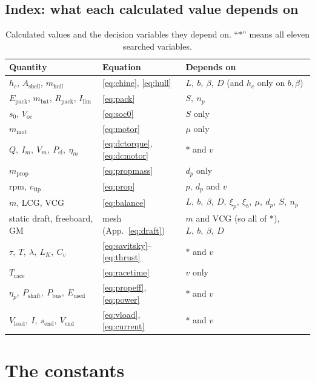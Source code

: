 \documentclass[11pt,a4paper]{article}
\renewcommand{\_}{\textunderscore\allowbreak}
\newcommand{\Trace}{T_{\mathrm{race}}}
\newcommand{\Pshaft}{P_{\mathrm{shaft}}}
\newcommand{\Pbus}{P_{\mathrm{bus}}}
\newcommand{\Eused}{E_{\mathrm{used}}}
\newcommand{\Epack}{E_{\mathrm{pack}}}
\newcommand{\Voc}{V_{\mathrm{oc}}}
\newcommand{\Vload}{V_{\mathrm{load}}}
\newcommand{\Vend}{V_{\mathrm{end}}}
\newcommand{\Rpack}{R_{\mathrm{pack}}}
\newcommand{\lcg}{\mathrm{LCG}}
\newcommand{\vcg}{\mathrm{VCG}}
\begin{document}
\subsection{Index: what each calculated value depends on}
\begin{table}[H]
\centering\small
\caption{Calculated values and the decision variables they depend on. ``$\ast$'' means all eleven searched variables.}
\label{tab:index}
\begin{tabularx}{\textwidth}{@{}l l X@{}}
\toprule
Quantity & Equation & Depends on \\
\midrule
$h_c$, $A_{\mathrm{shell}}$, $m_{\mathrm{hull}}$ & \eqref{eq:chine}, \eqref{eq:hull} & $L,\ b,\ \beta,\ D$ (and $h_c$ only on $b,\beta$) \\
$\Epack$, $m_{\mathrm{bat}}$, $\Rpack$, $I_{\lim}$ & \eqref{eq:pack} & $S,\ n_p$ \\
$s_0$, $\Voc$ & \eqref{eq:soc0} & $S$ only \\
$m_{\mathrm{mot}}$ & \eqref{eq:motor} & $\mu$ only \\
$Q,\ I_m,\ V_m,\ P_{\mathrm{el}},\ \eta_m$ & \eqref{eq:dctorque}, \eqref{eq:dcmotor} & $\ast$ and $v$ \\
$m_{\mathrm{prop}}$ & \eqref{eq:propmass} & $d_p$ only \\
rpm, $v_{\mathrm{tip}}$ & \eqref{eq:prop} & $p,\ d_p$ and $v$ \\
$m$, $\lcg$, $\vcg$ & \eqref{eq:balance} & $L,\ b,\ \beta,\ D,\ \xi_p,\ \xi_b,\ \mu,\ d_p,\ S,\ n_p$ \\
static draft, freeboard, GM & mesh (App.~\ref{eq:draft}) & $m$ and $\vcg$ (so all of $\ast$), $L,\ b,\ \beta,\ D$ \\
$\tau,\ T,\ \lambda,\ L_K,\ C_v$ & \eqref{eq:savitsky}--\eqref{eq:thrust} & $\ast$ and $v$ \\
$\Trace$ & \eqref{eq:racetime} & $v$ only \\
$\eta_p,\ \Pshaft,\ \Pbus,\ \Eused$ & \eqref{eq:propeff}, \eqref{eq:power} & $\ast$ and $v$ \\
$\Vload,\ I,\ s_{\mathrm{end}},\ \Vend$ & \eqref{eq:vload}, \eqref{eq:current} & $\ast$ and $v$ \\
\bottomrule
\end{tabularx}
\end{table}


\section{The constants}
\label{sec:fixed}
\end{document}
